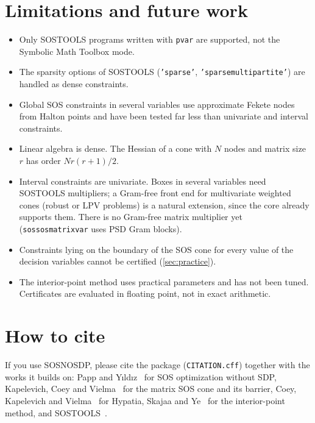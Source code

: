 \documentclass[11pt,a4paper]{article}
\newcommand{\code}[1]{\texttt{#1}}
\begin{document}
\section{Limitations and future work}\label{sec:limits}
\begin{itemize}[itemsep=2pt]
\item Only SOSTOOLS programs written with \code{pvar} are supported, not the Symbolic Math Toolbox mode.
\item The sparsity options of SOSTOOLS (\code{'sparse'}, \code{'sparsemultipartite'}) are handled as dense constraints.
\item Global SOS constraints in several variables use approximate Fekete nodes from Halton points and have been tested far less than univariate and interval constraints.
\item Linear algebra is dense. The Hessian of a cone with $N$ nodes and matrix size $r$ has order $Nr(r+1)/2$.
\item Interval constraints are univariate. Boxes in several variables need SOSTOOLS multipliers; a Gram-free front end for multivariate weighted cones (robust or LPV problems) is a natural extension, since the core already supports them. There is no Gram-free matrix multiplier yet (\code{sossosmatrixvar} uses PSD Gram blocks).
\item Constraints lying on the boundary of the SOS cone for every value of the decision variables cannot be certified (\cref{sec:practice}).
\item The interior-point method uses practical parameters and has not been tuned. Certificates are evaluated in floating point, not in exact arithmetic.
\end{itemize}

\section{How to cite}\label{sec:cite}
If you use SOSNOSDP, please cite the package (\code{CITATION.cff}) together with the works it builds on: Papp and Y{\i}ld{\i}z~\cite{PappYildiz2019} for SOS optimization without SDP, Kapelevich, Coey and Vielma~\cite{KCV2023} for the matrix SOS cone and its barrier, Coey, Kapelevich and Vielma~\cite{CKV2022} for Hypatia, Skajaa and Ye~\cite{SkajaaYe2015} for the interior-point method, and SOSTOOLS~\cite{SOSTOOLS}.
\end{document}
